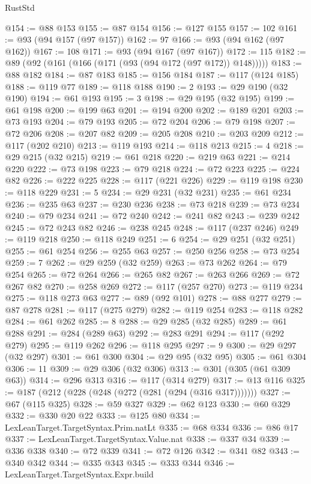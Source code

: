 \begin{lexlean}{RustStd}
\begin{coremodule}
{\begin{coremodule}
{{{{{{{{{{{{{{{{{{{{{{{{{{{{{{{{{{{{{{{{{{{{{{{{{{{{{{{@154 := @88 @153
@155 := @87 @154
@156 := @127 @155
@157 := 102
@161 := @93 (@94 @157 (@97 @157))
@162 := 97
@166 := @93 (@94 @162 (@97 @162))
@167 := 108
@171 := @93 (@94 @167 (@97 @167))
@172 := 115
@182 := @89 (@92 (@161 (@166 (@171 (@93 (@94 @172 (@97 @172)) @148)))))
@183 := @88 @182
@184 := @87 @183
@185 := @156 @184
@187 := @117 (@124 @185)
@188 := @119 @77
@189 := @118 @188
@190 := 2
@193 := @29 @190 (@32 @190)
@194 := @61 @193
@195 := 3
@198 := @29 @195 (@32 @195)
@199 := @61 @198
@200 := @199 @63
@201 := @194 @200
@202 := @189 @201
@203 := @73 @193
@204 := @79 @193
@205 := @72 @204
@206 := @79 @198
@207 := @72 @206
@208 := @207 @82
@209 := @205 @208
@210 := @203 @209
@212 := @117 (@202 @210)
@213 := @119 @193
@214 := @118 @213
@215 := 4
@218 := @29 @215 (@32 @215)
@219 := @61 @218
@220 := @219 @63
@221 := @214 @220
@222 := @73 @198
@223 := @79 @218
@224 := @72 @223
@225 := @224 @82
@226 := @222 @225
@228 := @117 (@221 @226)
@229 := @119 @198
@230 := @118 @229
@231 := 5
@234 := @29 @231 (@32 @231)
@235 := @61 @234
@236 := @235 @63
@237 := @230 @236
@238 := @73 @218
@239 := @73 @234
@240 := @79 @234
@241 := @72 @240
@242 := @241 @82
@243 := @239 @242
@245 := @72 @243 @82
@246 := @238 @245
@248 := @117 (@237 @246)
@249 := @119 @218
@250 := @118 @249
@251 := 6
@254 := @29 @251 (@32 @251)
@255 := @61 @254
@256 := @255 @63
@257 := @250 @256
@258 := @73 @254
@259 := 7
@262 := @29 @259 (@32 @259)
@263 := @73 @262
@264 := @79 @254
@265 := @72 @264
@266 := @265 @82
@267 := @263 @266
@269 := @72 @267 @82
@270 := @258 @269
@272 := @117 (@257 @270)
@273 := @119 @234
@275 := @118 @273 @63
@277 := @89 (@92 @101)
@278 := @88 @277
@279 := @87 @278
@281 := @117 (@275 @279)
@282 := @119 @254
@283 := @118 @282
@284 := @61 @262
@285 := 8
@288 := @29 @285 (@32 @285)
@289 := @61 @288
@291 := @284 (@289 @63)
@292 := @283 @291
@294 := @117 (@292 @279)
@295 := @119 @262
@296 := @118 @295
@297 := 9
@300 := @29 @297 (@32 @297)
@301 := @61 @300
@304 := @29 @95 (@32 @95)
@305 := @61 @304
@306 := 11
@309 := @29 @306 (@32 @306)
@313 := @301 (@305 (@61 @309 @63))
@314 := @296 @313
@316 := @117 (@314 @279)
@317 := @13 @116
@325 := @187 (@212 (@228 (@248 (@272 (@281 (@294 (@316 @317)))))))
@327 := @67 (@115 @325)
@328 := @59 @327
@329 := @62 @123
@330 := @60 @329
@332 := @330 @20 @22
@333 := @125 @80
@334 := LexLeanTarget.TargetSyntax.Prim.natLt
@335 := @68 @334
@336 := @86 @17
@337 := LexLeanTarget.TargetSyntax.Value.nat
@338 := @337 @34
@339 := @336 @338
@340 := @72 @339
@341 := @72 @126
@342 := @341 @82
@343 := @340 @342
@344 := @335 @343
@345 := @333 @344
@346 := LexLeanTarget.TargetSyntax.Expr.build
}}}}}}}}}}}}}}}}}}}}}}}}}}}}}}}}}}}}}}}}}}}}}}}}}}}}}}}
\end{coremodule}}
\end{coremodule}
\end{lexlean}
